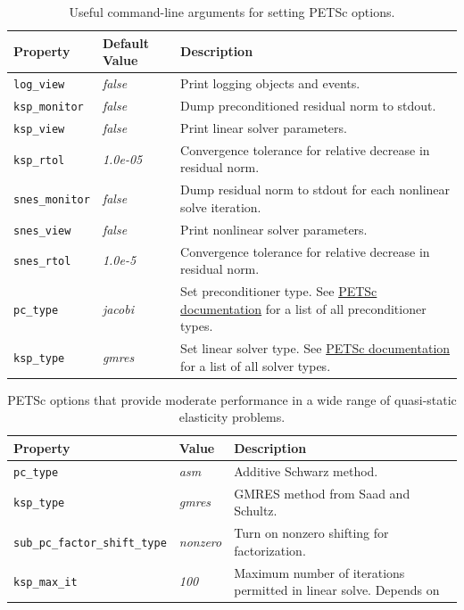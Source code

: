 \noindent \begin{center}
\begin{table}[H]
\centering{}\caption{\label{tab:petsc:options:defaults}Useful command-line arguments for
setting PETSc options.}
\begin{tabular}{|>{\raggedright}p{1.2in}|>{\centering}m{0.6in}|>{\raggedright}p{3.8in}|}
\hline 
\textbf{Property} & \textbf{Default Value} & \textbf{Description}\tabularnewline
\hline 
\hline 
\texttt{log\_view} & \textit{false} & Print logging objects and events.\tabularnewline
\hline 
\texttt{ksp\_monitor} & \textit{false} & Dump preconditioned residual norm to stdout.\tabularnewline
\hline 
\texttt{ksp\_view} & \textit{false} & Print linear solver parameters. \tabularnewline
\hline 
\texttt{ksp\_rtol} & \textit{1.0e-05} & Convergence tolerance for relative decrease in residual norm.\tabularnewline
\hline 
\texttt{snes\_monitor} & \textit{false} & Dump residual norm to stdout for each nonlinear solve iteration.\tabularnewline
\hline 
\texttt{snes\_view} & \textit{false} & Print nonlinear solver parameters.\tabularnewline
\hline 
\texttt{snes\_rtol} & \textit{1.0e-5} & Convergence tolerance for relative decrease in residual norm.\tabularnewline
\hline 
\texttt{pc\_type} & \textit{jacobi} & Set preconditioner type. See \href{http://www.mcs.anl.gov/petsc/petsc-as/documentation/linearsolvertable.html}{PETSc documentation}
for a list of all preconditioner types. \tabularnewline
\hline 
\texttt{ksp\_type} & \textit{gmres} & Set linear solver type. See \href{http://www.mcs.anl.gov/petsc/petsc-as/documentation/linearsolvertable.html}{PETSc documentation}
for a list of all solver types.\tabularnewline
\hline 
\end{tabular}
\end{table}
\begin{table}[H]
\centering{}\caption{\label{tab:petsc:options:recommended}PETSc options that provide moderate
performance in a wide range of quasi-static elasticity problems.}
\begin{tabular}{|>{\raggedright}p{2in}|>{\centering}m{0.75in}|>{\raggedright}p{3in}|}
\hline 
\textbf{Property} & \textbf{Value} & \textbf{Description}\tabularnewline
\hline 
\hline 
\texttt{pc\_type} & \textit{asm} & Additive Schwarz method.\tabularnewline
\hline 
\texttt{ksp\_type} & \textit{gmres} & GMRES method from Saad and Schultz.\tabularnewline
\hline 
\texttt{sub\_pc\_factor\_shift\_type} & \emph{nonzero} & Turn on nonzero shifting for factorization.\tabularnewline
\hline 
\texttt{ksp\_max\_it} & \emph{100} & Maximum number of iterations permitted in linear solve. Depends on

\end{tabular}
\end{table}
\end{center}
